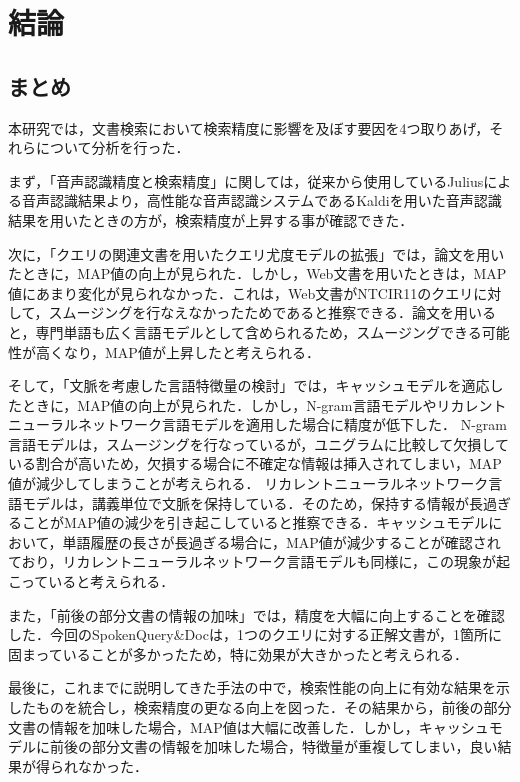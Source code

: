 
\chapter{結論} 
\section{まとめ}
本研究では，文書検索において検索精度に影響を及ぼす要因を4つ取りあげ，それらについて分析を行った．

まず，「音声認識精度と検索精度」に関しては，従来から使用しているJuliusによる音声認識結果より，高性能な音声認識システムであるKaldiを用いた音声認識結果を用いたときの方が，検索精度が上昇する事が確認できた．

次に，「クエリの関連文書を用いたクエリ尤度モデルの拡張」では，論文を用いたときに，MAP値の向上が見られた．しかし，Web文書を用いたときは，MAP値にあまり変化が見られなかった．これは，Web文書がNTCIR11のクエリに対して，スムージングを行なえなかったためであると推察できる．論文を用いると，専門単語も広く言語モデルとして含められるため，スムージングできる可能性が高くなり，MAP値が上昇したと考えられる．

そして，「文脈を考慮した言語特徴量の検討」では，キャッシュモデルを適応したときに，MAP値の向上が見られた．しかし，N-gram言語モデルやリカレントニューラルネットワーク言語モデルを適用した場合に精度が低下した．
N-gram言語モデルは，スムージングを行なっているが，ユニグラムに比較して欠損している割合が高いため，欠損する場合に不確定な情報は挿入されてしまい，MAP値が減少してしまうことが考えられる．
リカレントニューラルネットワーク言語モデルは，講義単位で文脈を保持している．そのため，保持する情報が長過ぎることがMAP値の減少を引き起こしていると推察できる．キャッシュモデルにおいて，単語履歴の長さが長過ぎる場合に，MAP値が減少することが確認されており，リカレントニューラルネットワーク言語モデルも同様に，この現象が起こっていると考えられる．

また，「前後の部分文書の情報の加味」では，精度を大幅に向上することを確認した．今回のSpokenQuery\&Docは，1つのクエリに対する正解文書が，1箇所に固まっていることが多かったため，特に効果が大きかったと考えられる．

最後に，これまでに説明してきた手法の中で，検索性能の向上に有効な結果を示したものを統合し，検索精度の更なる向上を図った．その結果から，前後の部分文書の情報を加味した場合，MAP値は大幅に改善した．しかし，キャッシュモデルに前後の部分文書の情報を加味した場合，特徴量が重複してしまい，良い結果が得られなかった．


